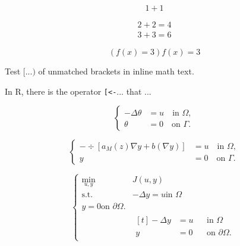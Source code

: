 \documentclass{article}
\begin{document}
\[
  1+1
\]

\begin{align}
  2+2 = 4\\[1ex]
  3+3 = 6
\end{align}

\begin{equation}
  \left(
    f(x) = 3
  \right)
  \left.
    f(x) = 3
  \right.
\end{equation}

Test $[ ... )$ of unmatched brackets in
inline math text.

In R, there is the operator \verb|[<-|...
that ...

\begin{equation*} 
  \left \{ 
    \begin{aligned}
      -\Delta \theta &= u \quad \text{in } \Omega, \\
      \theta &=0 \quad \text{on } \Gamma.
    \end{aligned}
  \right.
\end{equation*}

\begin{equation} \label{eq:state2}
  \left\{
    \begin{aligned}
      -\div [a_M(z)\nabla y + b(\nabla y)]  &= u \quad \text{in } \Omega, \\
      y &=0 \quad \text{on } \Gamma.
    \end{aligned}
  \right.
\end{equation}

\begin{equation}
  \left\{
    \begin{aligned}
      \min_{u,y} &J(u,y) \\
      \text{s.t.} \quad
                 &
                 -\Delta y = u \text{in } \Omega\\
                 y = 0 \text{on } \partial\Omega.
                 \\
                 &\begin{aligned}[t]
                   -\Delta y &= u && \text{in } \Omega\\
                   y &= 0 && \text{on } \partial\Omega.
                 \end{aligned}
    \end{aligned}
  \right.
\end{equation}
\end{document}
